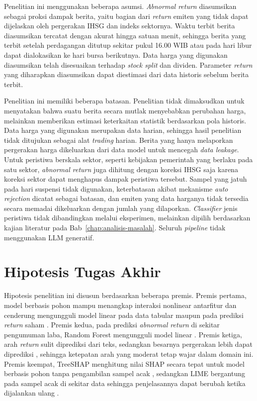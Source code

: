 Penelitian ini menggunakan beberapa asumsi. \emph{Abnormal return} diasumsikan sebagai proksi dampak berita, yaitu bagian dari \emph{return} emiten yang tidak dapat dijelaskan oleh pergerakan IHSG dan indeks sektornya. Waktu terbit berita diasumsikan tercatat dengan akurat hingga satuan menit, sehingga berita yang terbit setelah perdagangan ditutup sekitar pukul 16.00 WIB atau pada hari libur dapat dialokasikan ke hari bursa berikutnya. Data harga yang digunakan diasumsikan telah disesuaikan terhadap \emph{stock split} dan dividen. Parameter \emph{return} yang diharapkan diasumsikan dapat diestimasi dari data historis sebelum berita terbit.

Penelitian ini memiliki beberapa batasan. Penelitian tidak dimaksudkan untuk menyatakan bahwa suatu berita secara mutlak menyebabkan perubahan harga, melainkan memberikan estimasi keterkaitan statistik berdasarkan pola historis. Data harga yang digunakan merupakan data harian, sehingga hasil penelitian tidak ditujukan sebagai alat \emph{trading} harian. Berita yang hanya melaporkan pergerakan harga dikeluarkan dari data model untuk mencegah \emph{data leakage}. Untuk peristiwa berskala sektor, seperti kebijakan pemerintah yang berlaku pada satu sektor, \emph{abnormal return} juga dihitung dengan koreksi IHSG saja karena koreksi sektor dapat menghapus dampak peristiwa tersebut. Sampel yang jatuh pada hari suspensi tidak digunakan, keterbatasan akibat mekanisme \emph{auto rejection} dicatat sebagai batasan, dan emiten yang data harganya tidak tersedia secara memadai dikeluarkan dengan jumlah yang dilaporkan. \emph{Classifier} jenis peristiwa tidak dibandingkan melalui eksperimen, melainkan dipilih berdasarkan kajian literatur pada Bab~\ref{chap:analisis-masalah}. Seluruh \emph{pipeline} tidak menggunakan LLM generatif.

\section{Hipotesis Tugas Akhir}

Hipotesis penelitian ini disusun berdasarkan beberapa premis. Premis pertama, model berbasis pohon mampu menangkap interaksi nonlinear antarfitur dan cenderung mengungguli model linear pada data tabular \autocite{grinsztajn2022} maupun pada prediksi \emph{return} saham \autocite{gu2020}. Premis kedua, pada prediksi \emph{abnormal return} di sekitar pengumuman laba, Random Forest mengungguli model linear \autocite{amelzadeh2020}. Premis ketiga, arah \emph{return} sulit diprediksi dari teks, sedangkan besarnya pergerakan lebih dapat diprediksi \autocite{luss2015}, sehingga ketepatan arah yang moderat tetap wajar dalam domain ini. Premis keempat, TreeSHAP menghitung nilai SHAP secara tepat untuk model berbasis pohon tanpa pengambilan sampel acak \autocite{lundberg2020}, sedangkan LIME bergantung pada sampel acak di sekitar data sehingga penjelasannya dapat berubah ketika dijalankan ulang \autocite{zhang2019}.


